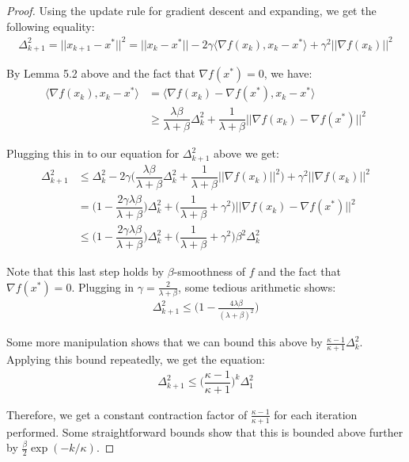 \documentclass[12pt]{report}
\begin{document}
\begin{proof}
Using the update rule for gradient descent and expanding, we get the following equality:
\begin{align*}
\Delta_{k+1}^2 = ||x_{k+1}-x^*||^2 = ||x_k - x^*|| -2\gamma\langle \nabla f(x_k), x_k-x^*\rangle + \gamma^2||\nabla f(x_k)||^2\end{align*}

By Lemma 5.2 above and the fact that $\nabla f(x^*) = 0$, we have:
\begin{align*}
\langle \nabla f(x_k), x_k-x^*\rangle & = \langle \nabla f(x_k)-\nabla f(x^*), x_k-x^*\rangle\\
&\geq \dfrac{\lambda\beta}{\lambda+\beta}\Delta_k^2 + \dfrac{1}{\lambda+\beta}||\nabla f(x_k)-\nabla f(x^*)||^2\end{align*}

Plugging this in to our equation for $\Delta_{k+1}^2$ above we get:
\begin{align*}
\Delta_{k+1}^2 &\leq \Delta_k^2 -2\gamma\bigg(\dfrac{\lambda\beta}{\lambda+\beta}\Delta_k^2 + \dfrac{1}{\lambda+\beta}||\nabla f(x_k)||^2\bigg) + \gamma^2||\nabla f(x_k)||^2\\
&= \bigg(1-\dfrac{2\gamma\lambda\beta}{\lambda+\beta}\bigg)\Delta_k^2 + \bigg(\dfrac{1}{\lambda+\beta} + \gamma^2\bigg)||\nabla f(x_k) - \nabla f(x^*)||^2\\
&\leq \bigg(1-\dfrac{2\gamma\lambda\beta}{\lambda+\beta}\bigg)\Delta_k^2 + \bigg(\dfrac{1}{\lambda+\beta} + \gamma^2\bigg)\beta^2\Delta_k^2
\end{align*}

Note that this last step holds by $\beta$-smoothness of $f$ and the fact that $\nabla f(x^*) = 0$. Plugging in $\gamma = \frac{2}{\lambda+\beta}$, some tedious arithmetic shows:
\begin{align*}
\Delta_{k+1}^2 \leq \bigg(1 - \frac{4\lambda\beta}{(\lambda+\beta)^2}\bigg)\end{align*}

Some more manipulation shows that we can bound this above by $\frac{\kappa-1}{\kappa+1}\Delta_k^2$. Applying this bound repeatedly, we get the equation:
\begin{align*}
\Delta_{k+1}^2 \leq \bigg(\dfrac{\kappa-1}{\kappa+1}\bigg)^k\Delta_1^2\end{align*}

Therefore, we get a constant contraction factor of $\frac{\kappa-1}{\kappa+1}$ for each iteration performed. Some straightforward bounds show that this is bounded above further by $\frac{\beta}{2}\exp(-k/\kappa)$.
\end{proof}
\end{document}
